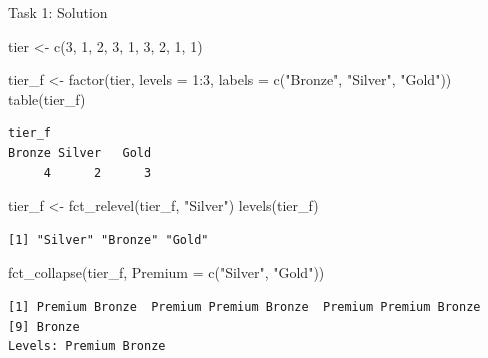 \documentclass[
  ignorenonframetext,
  aspectratio=169,
]{beamer}
\newenvironment{Shaded}{\begin{snugshade}}{\end{snugshade}}
\newcommand{\AttributeTok}[1]{\textcolor[rgb]{0.40,0.45,0.13}{#1}}
\newcommand{\DecValTok}[1]{\textcolor[rgb]{0.68,0.00,0.00}{#1}}
\newcommand{\FunctionTok}[1]{\textcolor[rgb]{0.28,0.35,0.67}{#1}}
\newcommand{\NormalTok}[1]{\textcolor[rgb]{0.00,0.23,0.31}{#1}}
\newcommand{\OtherTok}[1]{\textcolor[rgb]{0.00,0.23,0.31}{#1}}
\newcommand{\SpecialCharTok}[1]{\textcolor[rgb]{0.37,0.37,0.37}{#1}}
\newcommand{\StringTok}[1]{\textcolor[rgb]{0.13,0.47,0.30}{#1}}
\begin{document}
\begin{frame}[fragile]{Task 1: Solution}
\protect\hypertarget{task-1-solution}{}
\begin{Shaded}
\begin{Highlighting}[]
\NormalTok{tier }\OtherTok{\textless{}{-}} \FunctionTok{c}\NormalTok{(}\DecValTok{3}\NormalTok{, }\DecValTok{1}\NormalTok{, }\DecValTok{2}\NormalTok{, }\DecValTok{3}\NormalTok{, }\DecValTok{1}\NormalTok{, }\DecValTok{3}\NormalTok{, }\DecValTok{2}\NormalTok{, }\DecValTok{1}\NormalTok{, }\DecValTok{1}\NormalTok{)}

\NormalTok{tier\_f }\OtherTok{\textless{}{-}} \FunctionTok{factor}\NormalTok{(tier, }\AttributeTok{levels =} \DecValTok{1}\SpecialCharTok{:}\DecValTok{3}\NormalTok{, }\AttributeTok{labels =} \FunctionTok{c}\NormalTok{(}\StringTok{"Bronze"}\NormalTok{, }\StringTok{"Silver"}\NormalTok{, }\StringTok{"Gold"}\NormalTok{))}
\FunctionTok{table}\NormalTok{(tier\_f)}
\end{Highlighting}
\end{Shaded}

\begin{verbatim}
tier_f
Bronze Silver   Gold 
     4      2      3 
\end{verbatim}

\begin{Shaded}
\begin{Highlighting}[]
\NormalTok{tier\_f }\OtherTok{\textless{}{-}} \FunctionTok{fct\_relevel}\NormalTok{(tier\_f, }\StringTok{"Silver"}\NormalTok{)}
\FunctionTok{levels}\NormalTok{(tier\_f)}
\end{Highlighting}
\end{Shaded}

\begin{verbatim}
[1] "Silver" "Bronze" "Gold"  
\end{verbatim}

\begin{Shaded}
\begin{Highlighting}[]
\FunctionTok{fct\_collapse}\NormalTok{(tier\_f, }\AttributeTok{Premium =} \FunctionTok{c}\NormalTok{(}\StringTok{"Silver"}\NormalTok{, }\StringTok{"Gold"}\NormalTok{))}
\end{Highlighting}
\end{Shaded}

\begin{verbatim}
[1] Premium Bronze  Premium Premium Bronze  Premium Premium Bronze 
[9] Bronze 
Levels: Premium Bronze
\end{verbatim}
\end{frame}
\end{document}
